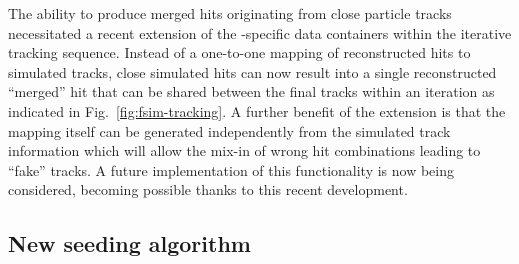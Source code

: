 
The ability to produce merged hits originating from close particle tracks necessitated a recent extension of the \FSIM{}-specific data containers within the iterative tracking sequence. Instead of a one-to-one mapping of reconstructed hits to simulated tracks, close simulated hits can now result into a single reconstructed ``merged'' hit that can be shared between the final tracks within an iteration as indicated in Fig.~\ref{fig:fsim-tracking}. A further benefit of the extension is that the mapping itself can be generated independently from the simulated track information which will allow the mix-in of wrong hit combinations leading to ``fake'' tracks. A future implementation of this functionality is now being considered, becoming possible thanks to this recent development.


\subsection{New seeding algorithm}
\label{sec:fsim-seeding}

